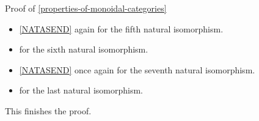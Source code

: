 \begin{Proof}{Proof of \cref{properties-of-monoidal-categories}}
\begin{itemize}
        \item \cref{NATASEND} again for the fifth natural isomorphism.
        \item {} for the sixth natural isomorphism.
        \item \cref{NATASEND} once again for the seventh natural isomorphism.
        \item {} for the last natural isomorphism.
    \end{itemize}
    This finishes the proof.
\end{Proof}
\begin{appendices}

\end{appendices}

